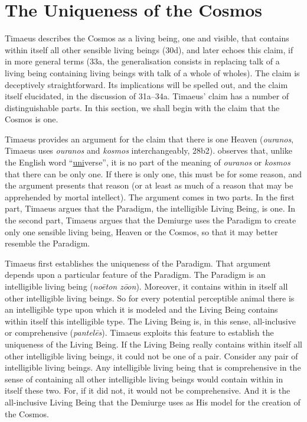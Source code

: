 
\section{The Uniqueness of the Cosmos} %
\label{sec:the_uniqueness_of_the_Cosmos}

Timaeus describes the Cosmos as a living being, one and visible, that contains within itself all other sensible living beings (30d), and later echoes this claim, if in more general terms (33a, the generalisation consists in replacing talk of a living being containing living beings with talk of a whole of wholes). The claim is deceptively straightforward. Its implications will be spelled out, and the claim itself elucidated, in the discussion of 31a--34a. Timaeus' claim has a number of distinguishable parts. In this section, we shall begin with the claim that the Cosmos is one.

Timaeus provides an argument for the claim that there is one Heaven (\emph{ouranos}, Timaeus uses \emph{ouranos} and \emph{kosmos} interchangeably, 28b2). \citet[84]{Taylor:1928qb} observes that, unlike the English word ``\underline{uni}verse'', it is no part of the meaning of \emph{ouranos} or \emph{kosmos} that there can be only one. If there is only one, this must be for some reason, and the argument presents that reason (or at least as much of a reason that may be apprehended by mortal intellect). The argument comes in two parts. In the first part, Timaeus argues that the Paradigm, the intelligible Living Being, is one. In the second part, Timaeus argues that the Demiurge uses the Paradigm to create only one sensible living being, Heaven or the Cosmos, so that it may better resemble the Paradigm.

Timaeus first establishes the uniqueness of the Paradigm. That argument depends upon a particular feature of the Paradigm. The Paradigm is an intelligible living being (\emph{noēton zōon}). Moreover, it contains within in itself all other intelligible living beings. So for every potential perceptible animal there is an intelligible type upon which it is modeled and the Living Being contains within itself this intelligible type. The Living Being is, in this sense, all-inclusive or comprehensive (\emph{pantelēs}). Timaeus exploits this feature to establish the uniqueness of the Living Being. If the Living Being really contains within itself all other intelligible living beings, it could not be one of a pair. Consider any pair of intelligible living beings. Any intelligible living being that is comprehensive in the sense of containing all other intelligible living beings would contain within in itself these two. For, if it did not, it would not be comprehensive. And it is the all-inclusive Living Being that the Demiurge uses as His model for the creation of the Cosmos.

